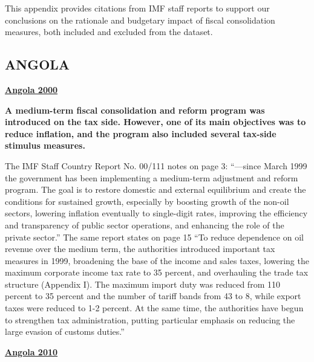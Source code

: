 This appendix provides citations from IMF staff reports to support our conclusions on the rationale and budgetary impact of fiscal consolidation measures, both included and excluded from the dataset.

\subsection[ANGOLA]{ANGOLA\protect\footnotemark}


\textbf{\underline{Angola 2000}} 

\textbf{A medium-term fiscal consolidation and reform program was introduced on the tax side. However, one of its main objectives was to reduce inflation, and the program also included several tax-side stimulus measures.}

The IMF Staff Country Report No. 00/111 notes on page 3: “---since March 1999 the government has been implementing a medium-term adjustment and reform program. The goal is to restore domestic and external equilibrium and create the conditions for sustained growth, especially by boosting growth of the non-oil sectors, lowering inflation eventually to single-digit rates, improving the efficiency and transparency of public sector operations, and enhancing the role of the private sector.” The same report states on page 15 “To reduce dependence on oil revenue over the medium term, the authorities introduced important tax measures in 1999, broadening the base of the income and sales taxes, lowering the maximum corporate income tax rate to 35 percent, and overhauling the trade tax structure (Appendix I). The maximum import duty was reduced from 110 percent to 35 percent and the number of tariff bands from 43 to 8, while export taxes were reduced to 1-2 percent. At the same time, the authorities have begun to strengthen tax administration, putting particular emphasis on reducing the large evasion of customs duties.”

\textbf{\underline{Angola 2010}}

